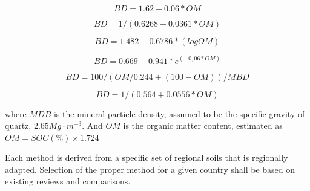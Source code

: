 \documentclass[10pt,b5paper,]{book}
\theoremstyle{definition}
\theoremstyle{definition}
\theoremstyle{definition}
\theoremstyle{remark}
\begin{document}
\begin{equation}
BD = 1.62-0.06 * OM
\end{equation}

\cite{saini_1966_organic}

\begin{equation}
BD = 1/(0.6268 + 0.0361 * OM)
\end{equation}

\cite{Drew1973}

\begin{equation}
BD = 1.482 - 0.6786 * (log OM)
\end{equation}

\cite{jeffrey1970note}

\begin{equation}
BD = 0.669 + 0.941 * e^{(-0,06 * OM)}
\end{equation}

\cite{Grigal1989}

\begin{equation}
BD = 100/(OM/0.244 + (100-OM))/MBD
\end{equation}

\cite{adams1973effect}

\begin{equation}
BD = 1/(0.564 + 0.0556*OM)
\end{equation}

\cite{honeysett1989use}

where \(MDB\) is the mineral particle density, assumed to be the
specific gravity of quartz, \(2.65 Mg \cdot m^{-3}\). And \(OM\) is the
organic matter content, estimated as \(OM = SOC(\%) × 1.724\)

Each method is derived from a specific set of regional soils that is
regionally adapted. Selection of the proper method for a given country
shall be based on existing reviews and comparisons.
\end{document}

